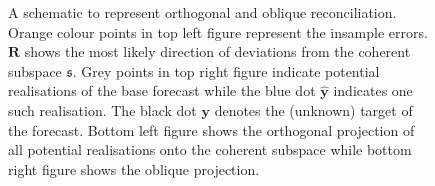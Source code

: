 \documentclass[12pt]{article}
\theoremstyle{definition}
\theoremstyle{property}
\begin{document}
	\begin{figure}
	
	\begin{adjustbox}{minipage=\linewidth,scale=0.7}
	\begin{subfigure}[t]{0.45\textwidth}
		
	\end{subfigure}
	\hspace{1cm}
	\begin{subfigure}[t]{0.45\textwidth}
		
	\end{subfigure}
	
	\vfill
	
	\begin{subfigure}[t]{0.45\textwidth}
		
	\end{subfigure}
	\hspace{1cm}
	\begin{subfigure}[t]{0.45\textwidth}
		
	\end{subfigure}
	
	
	\end{adjustbox}
\caption{A schematic to represent orthogonal and oblique reconciliation.  Orange colour points in top left figure represent the insample errors. $\bm{R}$ shows the most likely direction of deviations from the coherent subspace $\mathfrak{s}$. Grey points in top right figure indicate  potential realisations of the base forecast while the blue dot ${\hat{\bm y}}$ indicates one such realisation. The black dot ${\bm y}$ denotes the (unknown) target of the forecast. Bottom left figure shows the orthogonal projection of all potential realisations onto the coherent subspace while bottom right figure shows the oblique projection.} \label{fig:OthogonalVSOblique_projection}
\end{figure}
\end{document}
